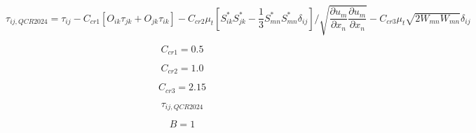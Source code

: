 \documentclass{article}
\begin{document}
\begin{equation}
\tau_{ij,QCR2024}=\tau_{ij} - C_{cr1}[O_{ik}\tau_{jk}+O_{jk}\tau_{ik}]-C_{cr2}\mu_t 
\left[S^*_{ik}S^*_{jk}-\frac{1}{3}S^*_{mn}S^*_{mn}\delta_{ij}\right]/\sqrt{\frac{\partial u_m}{\partial x_n}\frac{\partial u_m}{\partial x_n}}
-C_{cr3}\mu_t\sqrt{2W_{mn}W_{mn}}\delta_{ij}
\end{equation}

\begin{equation}
C_{cr1}=0.5
\end{equation}

\begin{equation}
C_{cr2}=1.0
\end{equation}

\begin{equation}
C_{cr3}=2.15
\end{equation}

\begin{equation}
\tau_{ij,QCR2024}
\end{equation}

\begin{equation}
B=1
\end{equation}
\end{document}
